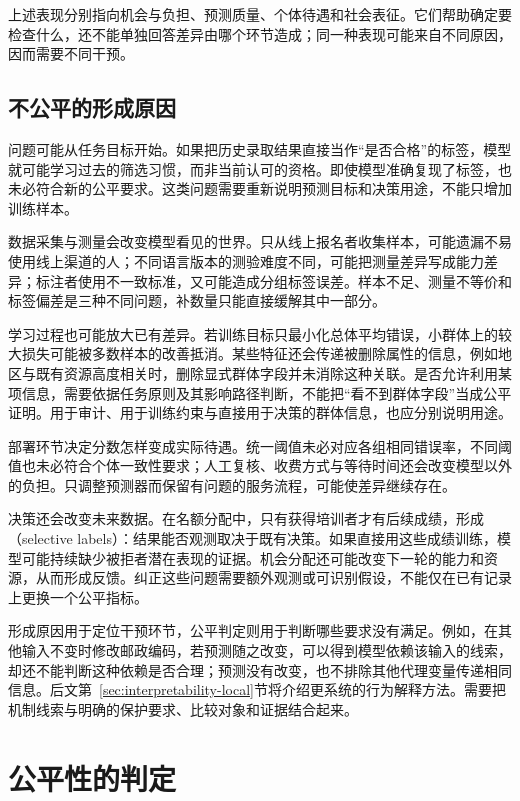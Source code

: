 上述表现分别指向机会与负担、预测质量、个体待遇和社会表征。它们帮助确定要检查什么，还不能单独回答差异由哪个环节造成；同一种表现可能来自不同原因，因而需要不同干预。

\subsection{不公平的形成原因}
\label{sec:fairness-causes}

问题可能从任务目标开始。如果把历史录取结果直接当作“是否合格”的标签，模型就可能学习过去的筛选习惯，而非当前认可的资格。即使模型准确复现了标签，也未必符合新的公平要求。这类问题需要重新说明预测目标和决策用途，不能只增加训练样本。

数据采集与测量会改变模型看见的世界。只从线上报名者收集样本，可能遗漏不易使用线上渠道的人；不同语言版本的测验难度不同，可能把测量差异写成能力差异；标注者使用不一致标准，又可能造成分组标签误差。样本不足、测量不等价和标签偏差是三种不同问题，补数量只能直接缓解其中一部分。

学习过程也可能放大已有差异。若训练目标只最小化总体平均错误，小群体上的较大损失可能被多数样本的改善抵消。某些特征还会传递被删除属性的信息，例如地区与既有资源高度相关时，删除显式群体字段并未消除这种关联。是否允许利用某项信息，需要依据任务原则及其影响路径判断，不能把“看不到群体字段”当成公平证明。用于审计、用于训练约束与直接用于决策的群体信息，也应分别说明用途。

部署环节决定分数怎样变成实际待遇。统一阈值未必对应各组相同错误率，不同阈值也未必符合个体一致性要求；人工复核、收费方式与等待时间还会改变模型以外的负担。只调整预测器而保留有问题的服务流程，可能使差异继续存在。

决策还会改变未来数据。在名额分配中，只有获得培训者才有后续成绩，形成（selective labels）：结果能否观测取决于既有决策。如果直接用这些成绩训练，模型可能持续缺少被拒者潜在表现的证据。机会分配还可能改变下一轮的能力和资源，从而形成反馈。纠正这些问题需要额外观测或可识别假设，不能仅在已有记录上更换一个公平指标。

形成原因用于定位干预环节，公平判定则用于判断哪些要求没有满足。例如，在其他输入不变时修改邮政编码，若预测随之改变，可以得到模型依赖该输入的线索，却还不能判断这种依赖是否合理；预测没有改变，也不排除其他代理变量传递相同信息。后文第~\ref{sec:interpretability-local}节将介绍更系统的行为解释方法。需要把机制线索与明确的保护要求、比较对象和证据结合起来。

\section{公平性的判定}
\label{sec:fairness-criteria}

